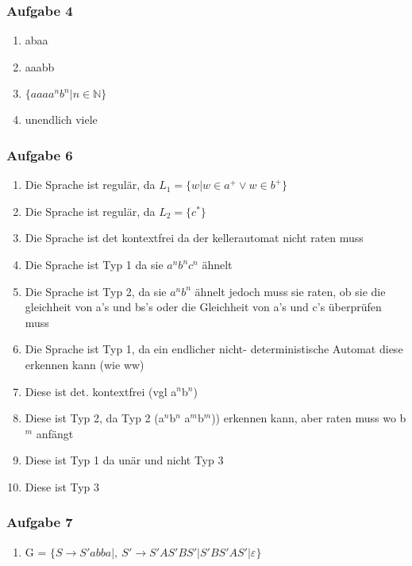 \documentclass[12pt]{scrartcl}
\begin{document}
\subsubsection{Aufgabe 4}
	\begin{enumerate}
		\item abaa
		\item aaabb
		\item \(\{aaaa^{n}b^{n}|n\in \mathbb{N}\}\)
		\item unendlich viele 
	\end{enumerate}
	
\subsubsection{Aufgabe 6}
	\begin{enumerate}
	
		\item Die Sprache ist regulär, da \(L_1 = \{w | w \in a^{+} \lor w \in b^{+} \} \)
		\item Die Sprache ist regulär, da \( L_2 = \{c^{*} \} \)
		\item Die Sprache ist det kontextfrei da der kellerautomat nicht raten muss 
		\item Die Sprache ist Typ 1 da sie \( a^{n} b^{n} c^{n} \) ähnelt
		\item Die Sprache ist Typ 2, da sie \(a^{n} b^{n} \) ähnelt jedoch muss sie raten, ob sie die gleichheit von a's und  bs's oder die Gleichheit von a's und c's überprüfen muss
		\item Die Sprache ist Typ 1, da ein endlicher nicht- deterministische Automat diese erkennen kann (wie ww)
		\item Diese ist det. kontextfrei (vgl a$^{n}$b$^{n}$)
		\item Diese ist Typ 2, da Typ 2 (a$^{n}$b$^{n}$ a$^{m}$b$^{m}$)) erkennen kann, aber raten muss wo b$^{m}$ anfängt
		\item Diese ist Typ 1 da unär und nicht Typ 3
		\item Diese ist Typ 3
	\end{enumerate}

\subsubsection{Aufgabe 7}
	\begin{enumerate}
		\item G = \(\{S \rightarrow S'abba | ,\ S' \rightarrow S'AS'BS'| S'BS'AS'|\varepsilon \}\)
	\end{enumerate}
\end{document}
